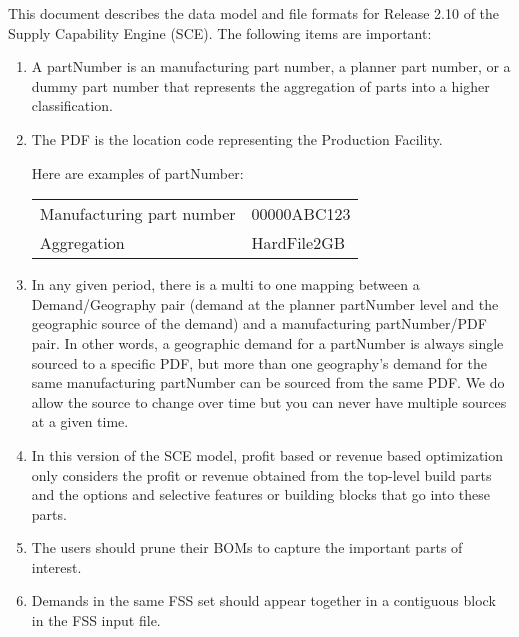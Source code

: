 This document describes the data model and file formats 
for Release 2.10 of the Supply Capability 
Engine (SCE).  The following items are important:
\begin{enumerate}

\item A partNumber is an manufacturing part number, a planner part number, or a dummy part number that
represents the aggregation of parts into a higher classification.
\item The PDF is the location code representing the Production Facility.
   
Here are examples of partNumber:
\begin{center}
\begin{tabular}{ll}
  Manufacturing part number  &   00000ABC123 \\
  Aggregation  &      HardFile2GB 
\end{tabular}
\end{center}

\item In any given period, there is a multi to one mapping between a
Demand/Geography pair (demand at the planner partNumber level and the
geographic source of the demand) and a manufacturing partNumber/PDF
pair.  In other words, a geographic demand for a partNumber is always
single sourced to a specific PDF, but more than one geography's demand
for the same manufacturing partNumber can be sourced from the same PDF.
We do allow the source to change
over time but you can never have multiple sources at a given time.

 
 
\item In this version of the SCE model, profit based or revenue based 
   optimization only considers the profit or revenue obtained from the
   top-level build parts and the options and selective features or building blocks
   that go into these parts.

\item The users should prune their BOMs to capture the important parts of
   interest.  

\item Demands in the same FSS set should appear together in a contiguous
   block in the FSS input file.
 
\end{enumerate}

